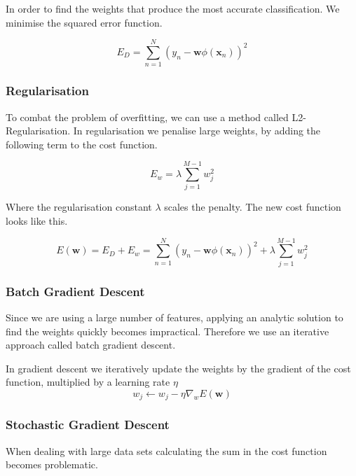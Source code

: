 In order to find the weights that produce the most accurate classification.
We minimise the squared error function.

\[ E_D = \sum_{n=1}^{N} \left(y_n - \textbf{w} \phi(\textbf{x}_n) \right)^2 \] 



\subsubsection{Regularisation}
To combat the problem of overfitting, we can use a method called L2-Regularisation.
In regularisation we penalise large weights, by adding the following term to the cost function.

\[ E_w = \lambda \sum_{j=1}^{M-1} w_j^2 \]

Where the regularisation constant $\lambda$ scales the penalty. 
The new cost function looks like this.

\[ E(\textbf{w})
  = E_D + E_w 
  = \sum_{n=1}^{N} \left(y_n - \textbf{w} \phi(\textbf{x}_n) \right)^2 + \lambda \sum_{j=1}^{M-1} w_j^2 \]

\begin{flushright}
\cite[online course]{courseraAI}
\end{flushright}

\subsubsection{Batch Gradient Descent}

Since we are using a large number of features, applying an analytic solution to find the weights quickly becomes impractical.
Therefore we use an iterative approach called batch gradient descent.

In gradient descent we iteratively update the weights by the gradient of the cost function, multiplied by a learning rate $\eta$  
\[ w_j \leftarrow w_j - \eta \nabla_w E(\textbf{w}) \]

\subsubsection{Stochastic Gradient Descent}\label{sec:stochastic}

When dealing with large data sets calculating the sum in the cost function becomes problematic.
 



